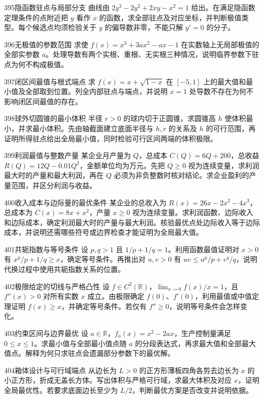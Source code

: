 \begin{exercise}{395}{隐函数驻点与局部分支}
曲线由 $2y^3-2y^2+2xy-x^2=1$ 给出。在满足隐函数定理条件的点附近把 $y$ 看作 $x$ 的函数，求全部驻点及对应坐标，并判断极值类型。每个候选点均须检验关于 $y$ 的偏导数非零，不能只解 $y'=0$ 的分子。
\end{exercise}
\begin{exercise}{396}{无极值的参数范围}
求使 $f(x)=x^3+3ax^2-ax-1$ 在实数轴上无局部极值的全部实参数 $a$。处理导数有两个实根、重根、无实根三种情况，说明临界参数下驻点为何不构成极值。
\end{exercise}
\begin{exercise}{397}{闭区间最值与根式端点}
求 $f(x)=x+\sqrt{1-x}$ 在 $[-5,1]$ 上的最大值和最小值及全部取到位置。列全内部驻点与端点，并说明 $x=1$ 处导数不存在为何不影响闭区间最值的存在。
\end{exercise}
\begin{exercise}{398}{球外切圆锥的最小体积}
半径 $r>0$ 的球内切于正圆锥，求圆锥高 $h$ 使体积最小，并求最小体积。先由轴截面建立底面半径与 $h,r$ 的关系及 $h$ 的可行范围，再证明所得驻点给出全局最小值，同时检验可行区间两端的体积极限。
\end{exercise}
\begin{exercise}{399}{利润最值与整数产量}
某企业月产量为 $Q$，总成本 $C(Q)=6Q+200$，总收益 $R(Q)=12Q-0.01Q^2$，金额单位均为万元。先把 $Q\ge0$ 视为连续变量，求利润最大时的产量和最大利润，再在 $Q$ 必须为非负整数时核对结论。求企业盈利的产量范围，并区分利润与收益。
\end{exercise}
\begin{exercise}{400}{收入成本与边际量的最优条件}
某企业的总收入为 $R(x)=26x-2x^2-4x^3$，总成本为 $C(x)=8x+x^2$，产量 $x\ge0$ 视为连续变量。求利润函数、边际收入和边际成本，确定利润最大时的产量与最大利润。核验最优点处边际收入等于边际成本，并说明还需哪些符号或边界检查才能证明为全局最大值。
\end{exercise}
\begin{exercise}{401}{共轭指数与等号条件}
设 $p,q>1$ 且 $1/p+1/q=1$。利用函数最值证明对 $x>0$ 有 $x^p/p+1/q\ge x$，确定等号条件。再推出对 $u,v>0$ 有 $uv\le u^p/p+v^q/q$，说明代换过程中使用共轭指数关系的位置。
\end{exercise}
\begin{exercise}{402}{极限给定的切线与严格凸性}
设 $f\in C^2(\mathbb R)$，$\lim_{x\to0}f(x)/x=1$，且 $f''(x)>0$ 对所有实数 $x$ 成立。由极限确定 $f(0)$、$f'(0)$，利用最值或中值定理证明 $f(x)\ge x$，并确定等号条件。若仅有 $f''\ge0$，说明等号条件会怎样变化。
\end{exercise}
\begin{exercise}{403}{约束区间与边界最优}
设 $a\in\mathbb R$，$f_a(x)=x^2-2ax$，生产控制量满足 $0\le x\le1$。求最小值与全部最小值点随 $a$ 的分段表达式，再求最大值和全部最大值点。解释为何只求驻点会遗漏部分参数下的最优解。
\end{exercise}
\begin{exercise}{404}{箱体设计与可行域端点}
从边长为 $L>0$ 的正方形薄板四角各剪去边长为 $x$ 的小正方形，折成无盖长方体。写出体积与严格可行域，求最大体积及对应 $x$，证明全局最优性。若要求底面边长至少为 $L/2$，判断最优方案是否改变并说明依据。
\end{exercise}
